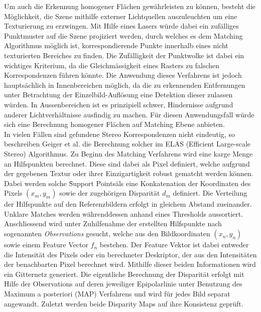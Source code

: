 \noindent
Um auch die Erkennung homogener Flächen gewährleisten zu können, besteht die Möglichkeit, die Szene mithilfe externer Lichtquellen auszuleuchten um eine Texturierung zu erzwingen. Mit Hilfe eines Lasers würde dabei ein zufälliges Punktmuster auf die Szene projiziert werden, durch welches es dem Matching Algorithmus möglich ist, korrespondierende Punkte innerhalb eines nicht texturierten Bereiches zu finden. Die Zufälligkeit der Punktwolke ist dabei ein wichtiges Kriterium, da die Gleichmässigkeit eines Rasters zu falschen Korrespondenzen führen könnte. Die Anwendung dieses Verfahrens ist jedoch hauptsächlich in Innenbereichen möglich, da die zu erkennenden Entfernungen unter Betrachtung der Einzelbild-Auflösung eine Detektion dieser zulassen würden. In Aussenbereichen ist es prinzipiell schwer, Hindernisse aufgrund anderer Lichtverhältnisse ausfindig zu machen. Für diesen Anwendungsfall würde sich eine Berechnung homogener Flächen auf Matching Ebene anbieten.\\

\noindent
In vielen Fällen sind gefundene Stereo Korrespondenzen nicht eindeutig, so beschreiben Geiger et al. \cite{geiger2011efficient} die Berechnung solcher im ELAS (Efficient Large-scale Stereo) Algorithmus. Zu Beginn des Matching Verfahrens wird eine karge Menge an Hilfspunkten berechnet. Diese sind dabei als Pixel definiert, welche aufgrund der gegebenen Textur oder ihrer Einzigartigkeit robust gematcht werden können. Dabei werden solche \"Support Points\" als eine Kon­ka­te­na­ti­on der Koordinaten des Pixels $(x_m,y_m)$ sowie der zugehörigen Disparität $d_m$ definiert. Die Verteilung der Hilfspunkte auf den Referenzbildern erfolgt in gleichem Abstand zueinander. Unklare Matches werden währenddessen anhand eines Thresholds aussortiert. Anschliessend wird unter Zuhilfenahme der erstellten Hilfspunkte nach sogenannten \emph{Observations} gesucht, welche aus den Bildkoordinaten $(x_n,y_n)$ sowie einem Feature Vector $f_n$ bestehen. Der Feature Vektor ist dabei entweder die Intensität des Pixels oder ein berechneter Deskriptor, der aus den Intensitäten der benachbarten Pixel berechnet wird. Mithilfe dieser beiden Informationen wird ein Gitternetz generiert. Die eigentliche Berechnung der Disparität erfolgt mit Hilfe der Observations auf deren jeweiliger Epipolarlinie unter Benutzung des Maximum a posteriori (MAP) Verfahrens und wird für jedes Bild separat angewandt. Zuletzt werden beide Disparity Maps auf ihre Konsistenz geprüft.\\

